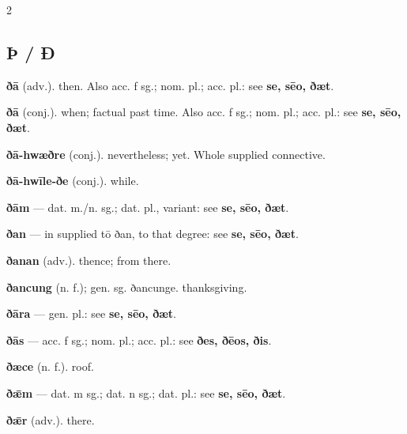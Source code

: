 \begin{multicols*}{2}
\subsection*{Þ / Ð}
\textbf{ðā} (adv.). then. Also acc. f sg.; nom. pl.; acc. pl.: see \textbf{se, sēo, ðæt}.\par
\textbf{ðā} (conj.). when; factual past time. Also acc. f sg.; nom. pl.; acc. pl.: see \textbf{se, sēo, ðæt}.\par
\textbf{ðā-hwæðre} (conj.). nevertheless; yet. Whole supplied connective.\par
\textbf{ðā-hwīle-ðe} (conj.). while.\par
\textbf{ðām} — dat. m./n. sg.; dat. pl., variant: see \textbf{se, sēo, ðæt}.\par
\textbf{ðan} — in supplied tō ðan, to that degree: see \textbf{se, sēo, ðæt}.\par
\textbf{ðanan} (adv.). thence; from there.\par
\textbf{ðancung} (n. f.); gen. sg. ðancunge. thanksgiving.\par
\textbf{ðāra} — gen. pl.: see \textbf{se, sēo, ðæt}.\par
\textbf{ðās} — acc. f sg.; nom. pl.; acc. pl.: see \textbf{ðes, ðēos, ðis}.\par
\textbf{ðæce} (n. f.). roof.\par
\textbf{ðǣm} — dat. m sg.; dat. n sg.; dat. pl.: see \textbf{se, sēo, ðæt}.\par
\textbf{ðǣr} (adv.). there.\par

\end{multicols*}
